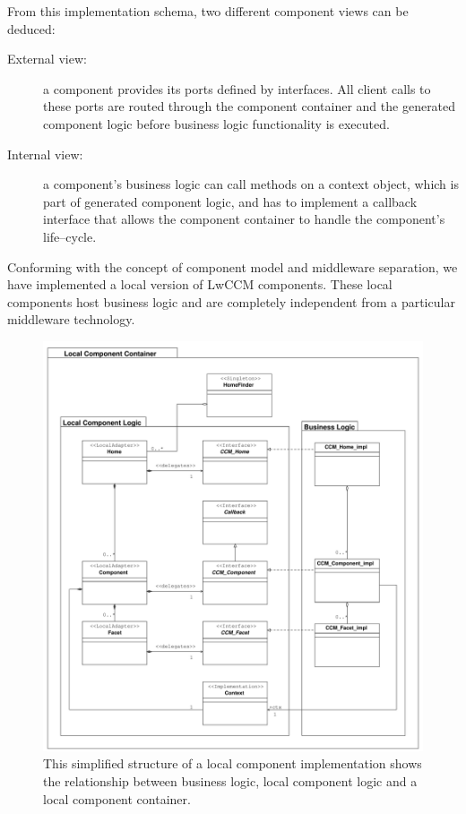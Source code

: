 \noindent
From this implementation schema, two different component views can be deduced:
\begin{description}
\item [External view:]
  a component provides its ports defined by interfaces. All 
  client calls to these ports are routed through the component container and 
  the generated component logic before business logic functionality is
  executed.
  
\item [Internal view:]
  a component's business logic can call methods on a context 
  object, which is part of generated component logic, and has to implement 
  a callback interface that allows the component container to handle the 
  component's life--cycle.
\end{description}


\noindent
Conforming with the concept of component model and 
middleware separation, we have implemented a local version of LwCCM components.
These local components host business logic and are completely independent 
from a particular middleware technology.

\begin{figure}[htbp]
    \begin{center}
    \includegraphics [width=15cm,angle=0] {ComponentModel/uml/StructureOfLocalComponents}
    \caption{This simplified structure of a local component implementation
    shows the relationship between business logic, local component logic and
    a local component container.}
    \label{StructureOfLocalComponents}            
    \end{center}
\end{figure}

